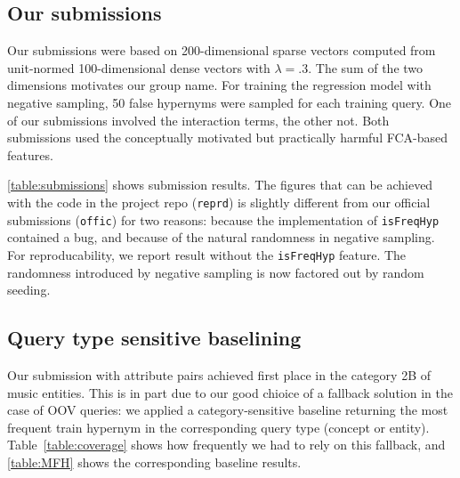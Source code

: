 \documentclass[11pt,a4paper]{article}
\begin{document}
\subsection{Our submissions}

Our submissions were based on 200-dimensional sparse vectors computed from
unit-normed 100-dimensional dense vectors with $\lambda=.3$. The sum of the two
dimensions motivates our group name. For training the regression model with
negative sampling, 50 false hypernyms were sampled for each training query. One
of our submissions involved the interaction terms, the other not. Both
submissions used the conceptually motivated but practically harmful FCA-based
features.

\autoref{table:submissions} shows submission results.
The figures that can be achieved with the code in the project repo
(\texttt{reprd}) is slightly different from our official submissions
(\texttt{offic}) for two reasons:
because the implementation of \texttt{isFreqHyp} contained a bug, and because
of the natural randomness in negative sampling.
For reproducability, we report result without the \texttt{isFreqHyp} feature.
The randomness introduced by negative sampling is now factored out by random
seeding.




\subsection{Query type sensitive baselining}

Our submission with attribute pairs achieved first place in the category 2B of
music entities. This is in part due to our good chioice of a fallback solution
in the case of OOV queries: we applied a category-sensitive baseline returning
the most frequent train hypernym in the corresponding query type (concept or
entity).  Table~\ref{table:coverage} shows how frequently we had to rely on
this fallback, and \autoref{table:MFH} shows the corresponding baseline
results.
\end{document}
